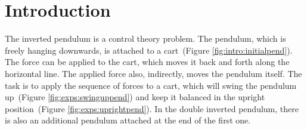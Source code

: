 \section{Introduction}
\label{s:intro}
The inverted pendulum is a control theory problem. The pendulum, which is freely hanging downwards, is attached to a cart\ (Figure \ref{fig:intro:initialpend}). The force can be applied to the cart, which moves it back and forth along the horizontal line. The applied force also, indirectly, moves the pendulum itself. The task is to apply the sequence of forces to a cart, which will swing the pendulum up\ (Figure \ref{fig:exps:swinguppend}) and keep it balanced in the upright position\ (Figure \ref{fig:exps:uprightpend}). In the double inverted pendulum, there is also an additional pendulum attached at the end of the first one.

\begin{figure}[!ht]
    \centering
    \begin{floatrow}
    \qquad
    \qquad
    \end{floatrow}
\end{figure}

